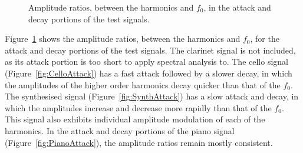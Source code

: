 \begin{figure}[h!]
			\caption{Amplitude ratios, between the harmonics and $f_{0}$, in the attack and decay
				 portions of the test signals.}
			\label{fig:AttackAmplitudes}
		\end{figure}

		Figure~\ref{fig:AttackAmplitudes} shows the amplitude ratios, between the harmonics and $f_{0}$, for the
		attack and decay portions of the test signals. The clarinet signal is not included, as its attack portion
		is too short to apply spectral analysis to. The cello signal (Figure~\ref{fig:CelloAttack}) has a fast
		attack followed by a slower decay, in which the amplitudes of the higher order harmonics decay quicker than
		that of the $f_{0}$. The synthesised signal (Figure~\ref{fig:SynthAttack}) has a slow attack and decay, in
		which the amplitudes increase and decrease more rapidly than that of the $f_{0}$. This signal also exhibits
		individual amplitude modulation of each of the harmonics. In the attack and decay portions of the piano
		signal (Figure~\ref{fig:PianoAttack}), the amplitude ratios remain mostly consistent.

